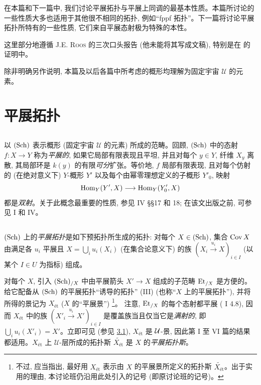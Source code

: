 \setcounter{pageoriginal}{341}

在\pageoriginale 本篇和下一篇中, 我们讨论平展拓扑与平展上同调的最基本性质。本篇所讨论的一些性质大多也适用于其他很不相同的拓扑, 例如“fppf 拓扑”。下一篇将讨论平展拓扑所特有的一些性质, 它们来自平展态射极为特殊的本性。

这里部分地遵循 J.E. \textsc{Roos} 的三次口头报告 (他未能将其写成文稿), 特别是在  的证明中。

除非明确另作说明, 本篇及以后各篇中所考虑的概形均理解为固定宇宙 $𝒰$ 的元素。

\section{平展拓扑}

\subsection{}

以 $(\operatorname{Sch})$ 表示概形 (固定宇宙 $𝒰$ 的元素) 所成的范畴。回顾, $(\operatorname{Sch})$ 中的态射 $f:X\to Y$ 称为\pageoriginale \emph{平展的}, 如果它局部有限表现且平坦, 并且对每个 $y\in Y$, 纤维 $X_y$ 离散, 其局部环是 $k(y)$ 的有限\emph{可分}扩张。等价地, $f$ 局部有限表现, 且对每个仿射的 (在绝对意义下) $Y$-概形 $Y'$ 以及每个由幂零理想定义的子概形 $Y'_0$, 映射
$$
\Hom_Y (Y', X) \to \Hom_Y (Y'_{0}, X)
$$
都是\emph{双射}。关于此概念最重要的性质, 参见 \EGA IV \S\S 17 和 18; 在该文出版之前, 可参见  I 和 IV。

\subsection{}

$(\operatorname{Sch})$ 上的\emph{平展拓扑}是如下预拓扑所生成的拓扑: 对每个 $X\in(\operatorname{Sch})$, 集合 $\operatorname{Cov} X$ 由满足各 $u_i$ 平展且 $X=\bigcup_i u_i(X_i)$ (在集合论意义下) 的族 $(X_i\xrightarrow{u_i}X)_{i\in I}$ (以某个 $I\in U$ 为指标) 组成。

对每个 $X$, 引入 $(\operatorname{Sch})_{/X}$ 中由平展箭头 $X'\to X$ 组成的子范畴 $\operatorname{Et}_{/X}$ 是方便的。给它配备从 $(\operatorname{Sch})$ 的平展拓扑“诱导的拓扑” (III) (也称“$X$ 上的平展拓扑”), 并将所得的景记为 $X_{\text{ét}}$ ($X$ 的“平展景”)
\footnote{不过, 应当指出, 最好用 $X_{\text{ét}}$ 表示由 $X$ 的平展景所定义的拓扑斯 $\widetilde{X_{\text{ét}}}$。出于实用的理由, 本讨论班仍沿用此处引入的记号 (即原讨论班的记号)。}。
注意, $\operatorname{Et}_{/X}$ 的每个态射都平展 ( I 4.8), 因而 $X_{\text{ét}}$ 中的族 $(X'_i\xrightarrow{u_i}X')_{i\in I}$ 是覆盖族当且仅当它是\emph{满射的}, 即 $\bigcup_i u_i(X'_i)=X'$。立即可见 (参见 \hyperref[VII.prop3.1]{3.1}), $X_{\text{ét}}$ 是 ${\mathcal U}$-景, 因此第 I 至 VI 篇的结果都适用。$X_{\text{ét}}$ 上 $𝒰$-层所成的拓扑斯 $\widetilde{X_{\text{ét}}}$ 是 $X$ 的\emph{平展拓扑斯}。

